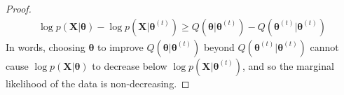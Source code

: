 \documentclass[10pt,landscape]{article}
\begin{document}
\begin{multicols}{3}
\begin{proof}
	\begin{align*}
		\log p(\mathbf{X}|\boldsymbol\theta) - \log p(\mathbf{X}|\boldsymbol\theta^{(t)})
		\ge Q(\boldsymbol\theta|\boldsymbol\theta^{(t)}) - Q(\boldsymbol\theta^{(t)}|\boldsymbol\theta^{(t)})
	\end{align*}
	In words, choosing $\boldsymbol\theta$ to improve $Q(\boldsymbol\theta|\boldsymbol\theta^{(t)})$ beyond $Q(\boldsymbol\theta^{(t)}|\boldsymbol\theta^{(t)})$ cannot cause $\log p(\mathbf{X}|\boldsymbol\theta)$ to decrease below $\log p(\mathbf{X}|\boldsymbol\theta^{(t)})$, and so the marginal likelihood of the data is non-decreasing.
\end{proof}

\end{multicols}
\end{document}
